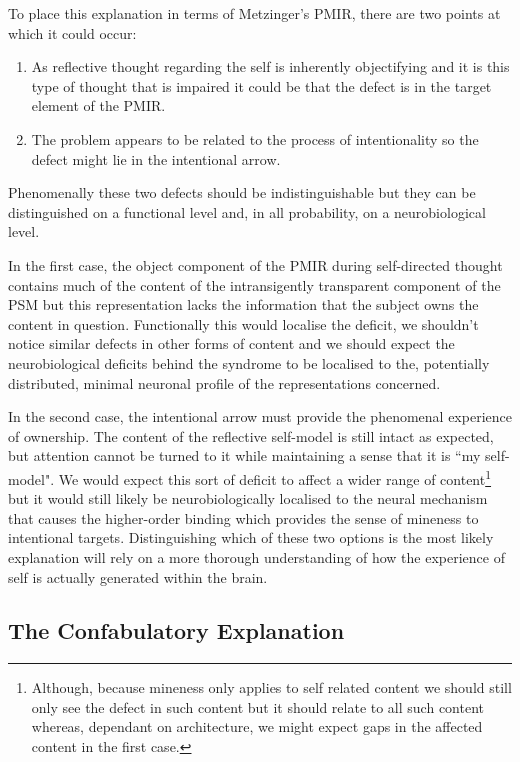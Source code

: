 To place this explanation in terms of Metzinger's PMIR, there are two points at which it could occur:
\begin{enumerate}
    \item As reflective thought regarding the self is inherently objectifying and it is this type of thought that is impaired it could be that the defect is in the target element of the PMIR.
    \item The problem appears to be related to the process of intentionality so the defect might lie in the intentional arrow.
\end{enumerate}
Phenomenally these two defects should be indistinguishable but they can be distinguished on a functional level and, in all probability, on a neurobiological level.

In the first case, the object component of the PMIR during self-directed thought contains much of the content of the intransigently transparent component of the PSM but this representation lacks the information that the subject owns the content in question. Functionally this would localise the deficit, we shouldn't notice similar defects in other forms of content and we should expect the neurobiological deficits behind the syndrome to be localised to the, potentially distributed, minimal neuronal profile of the representations concerned.

In the second case, the intentional arrow must provide the phenomenal experience of ownership. The content of the reflective self-model is still intact as expected, but attention cannot be turned to it while maintaining a sense that it is ``my self-model". We would expect this sort of deficit to affect a wider range of content\footnote{Although, because mineness only applies to self related content we should still only see the defect in such content but it should relate to all such content whereas, dependant on architecture, we might expect gaps in the affected content in the first case.} but it would still likely be neurobiologically localised to the neural mechanism that causes the higher-order binding which provides the sense of mineness to intentional targets.
Distinguishing which of these two options is the most likely explanation will rely on a more thorough understanding of how the experience of self is actually generated within the brain.

\subsection{The Confabulatory Explanation}
\label{psych_alternatives_confab}

